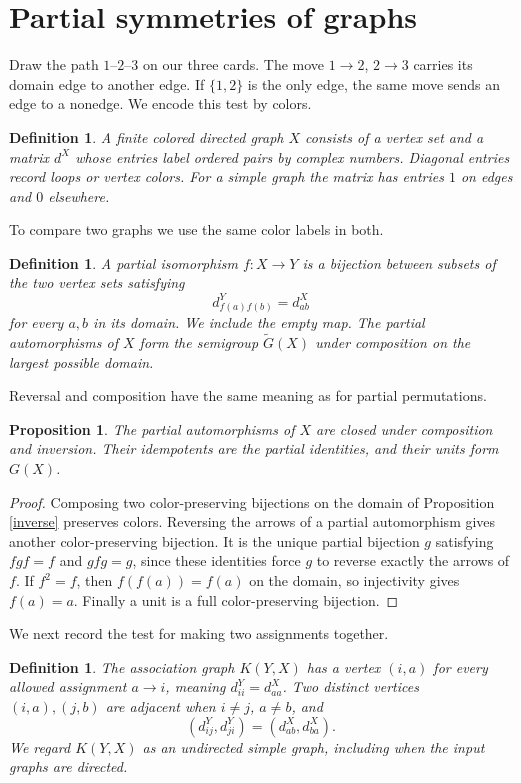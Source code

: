 \documentclass[11pt,a4paper]{article}
\newtheorem{prop}[thm]{Proposition}
\newtheorem{defn}[thm]{Definition}
\begin{document}
\section{Partial symmetries of graphs}\label{partialiso}

Draw the path $1$--$2$--$3$ on our three cards. The move $1\to2$, $2\to3$ carries its domain edge to another edge. If $\{1,2\}$ is the only edge, the same move sends an edge to a nonedge. We encode this test by colors.

\begin{defn}
A finite colored directed graph $X$ consists of a vertex set and a matrix $d^X$ whose entries label ordered pairs by complex numbers. Diagonal entries record loops or vertex colors. For a simple graph the matrix has entries $1$ on edges and $0$ elsewhere.
\end{defn}

To compare two graphs we use the same color labels in both.

\begin{defn}
A partial isomorphism $f:X\to Y$ is a bijection between subsets of the two vertex sets satisfying
\[
 d^Y_{f(a)f(b)}=d^X_{ab}
\]
for every $a,b$ in its domain. We include the empty map. The partial automorphisms of $X$ form the semigroup $\widetilde G(X)$ under composition on the largest possible domain.
\end{defn}

Reversal and composition have the same meaning as for partial permutations.

\begin{prop}
The partial automorphisms of $X$ are closed under composition and inversion. Their idempotents are the partial identities, and their units form $G(X)$.
\end{prop}
\begin{proof}
Composing two color-preserving bijections on the domain of Proposition \ref{inverse} preserves colors. Reversing the arrows of a partial automorphism gives another color-preserving bijection. It is the unique partial bijection $g$ satisfying $fgf=f$ and $gfg=g$, since these identities force $g$ to reverse exactly the arrows of $f$. If $f^2=f$, then $f(f(a))=f(a)$ on the domain, so injectivity gives $f(a)=a$. Finally a unit is a full color-preserving bijection.
\end{proof}

We next record the test for making two assignments together.

\begin{defn}\label{assoc}
The association graph $K(Y,X)$ has a vertex $(i,a)$ for every allowed assignment $a\to i$, meaning $d^Y_{ii}=d^X_{aa}$. Two distinct vertices $(i,a),(j,b)$ are adjacent when $i\ne j$, $a\ne b$, and
\[
 (d^Y_{ij},d^Y_{ji})=(d^X_{ab},d^X_{ba}).
\]
We regard $K(Y,X)$ as an undirected simple graph, including when the input graphs are directed.
\end{defn}
\end{document}
